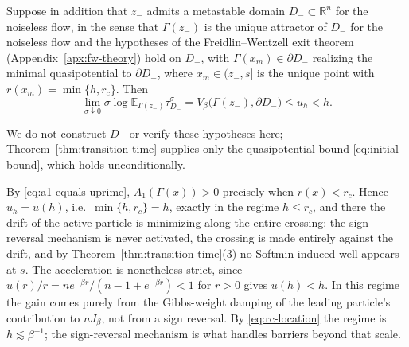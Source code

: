 \documentclass{opt2026} %
\newcommand{\prefactor}[2]{A_{#1}(#2)}
\newcommand{\R}{\mathbb{R}}
\newcommand{\E}{\mathbb{E}}
\begin{document}
\begin{corollary}
\label{cor:exit-time-conditional}
Suppose in addition that $z_-$ admits a metastable domain $D_-\subset\R^n$ for the noiseless flow, in the sense that $\Gamma(z_-)$ is the unique attractor of $D_-$ for the noiseless flow and the hypotheses of the Freidlin--Wentzell exit theorem (Appendix~\ref{apx:fw-theory}) hold on $D_-$, with $\Gamma(x_m)\in\partial D_-$ realizing the minimal quasipotential to $\partial D_-$, where $x_m\in(z_-,s]$ is the unique point with $r(x_m)=\min\{h,r_c\}$. Then
\[
    \lim_{\sigma\downarrow0}\sigma\log \E_{\Gamma(z_-)}\tau_{D_-}^\sigma
    =V_\beta\bigl(\Gamma(z_-),\partial D_-\bigr)\le u_h<h.
\]
\end{corollary}
We do not construct $D_-$ or verify these hypotheses here; Theorem~\ref{thm:transition-time} supplies only the quasipotential bound \eqref{eq:initial-bound}, which holds unconditionally.

\begin{remark}
\label{rem:low-barrier}
By \eqref{eq:a1-equals-uprime}, $\prefactor{1}{\Gamma(x)}>0$ precisely when $r(x)<r_c$. Hence $u_h=u(h)$, i.e.\ $\min\{h,r_c\}=h$, exactly in the regime $h\le r_c$, and there the drift of the active particle is minimizing along the entire crossing: the sign-reversal mechanism is never activated, the crossing is made entirely against the drift, and by Theorem~\ref{thm:transition-time}(3) no Softmin-induced well appears at $s$. The acceleration is nonetheless strict, since $u(r)/r=ne^{-\beta r}/(n-1+e^{-\beta r})<1$ for $r>0$ gives $u(h)<h$. In this regime the gain comes purely from the Gibbs-weight damping of the leading particle's contribution to $nJ_\beta$, not from a sign reversal. By \eqref{eq:rc-location} the regime is $h\lesssim\beta^{-1}$; the sign-reversal mechanism is what handles barriers beyond that scale.
\end{remark}
\end{document}
